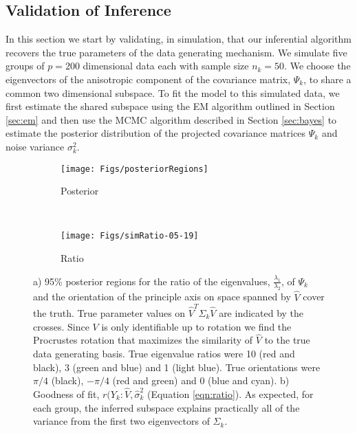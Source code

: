 \documentclass[12pt]{article}
\begin{document}
\subsection{Validation of Inference}

In this section we start by validating, in simulation, that our
inferential algorithm recovers the true parameters of the data
generating mechanism.  We simulate five groups of $p=200$ dimensional
data each with sample size $n_k=50$.  We choose the eigenvectors of
the anisotropic component of the covariance matrix, $\Psi_k$, to share
a common two dimensional subspace.  To fit the model to this simulated
data, we first estimate the shared subspace using the EM algorithm outlined
in Section \ref{sec:em} and then use the MCMC algorithm described in
Section \ref{sec:bayes} to estimate the posterior distribution of the
projected covariance matrices $\Psi_k$ and noise variance $\sigma_k^2$.

\begin{figure}[t]
    \centering
    \begin{subfigure}[b]{0.45\textwidth}
    \texttt{[image: Figs/posteriorRegions]}
        \caption{Posterior}
        \label{fig:simPosterior}
    \end{subfigure}
    ~ %
    \begin{subfigure}[b]{0.4\textwidth}
        \texttt{[image: Figs/simRatio-05-19]}
        \caption{Ratio}
        \label{fig:simRatio}
    \end{subfigure}
    \caption{a) 95\% posterior regions for the ratio of the
      eigenvalues, $\frac{\lambda_1}{\lambda_2}$, of $\Psi_k$ and the
      orientation of the principle axis on space spanned by $\hat{V}$
      cover the truth.  True parameter values on
      $\hat{V}^T\Sigma_k\hat{V}$ are indicated by the crosses.  Since
      $V$ is only identifiable up to rotation we find the Procrustes
      rotation that maximizes the similarity of $\hat{V}$ to the true
      data generating basis. True eigenvalue ratios were 10 (red and
      black), 3 (green and blue) and 1 (light blue).  True
      orientations were $\pi/4$ (black), $-\pi/4$ (red and green) and
      0 (blue and cyan).  b) Goodness of fit,
      $r(Y_k: \hat{V}, \hat{\sigma}^2_k$ (Equation \ref{eqn:ratio}).
      As expected, for each group, the inferred subspace explains
      practically all of the variance from the first two eigenvectors
      of $\Sigma_k$.  }
\end{figure}
\end{document}
